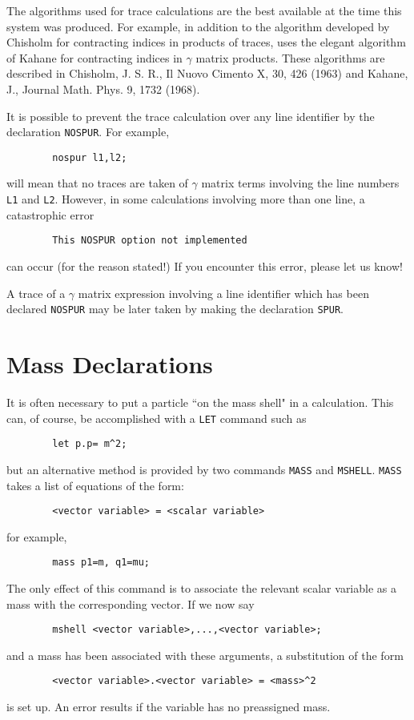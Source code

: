 The algorithms used for trace calculations are the best available at the
time this system was produced. For example, in addition to the algorithm
developed by Chisholm for contracting indices in products of traces,
{\REDUCE} uses the elegant algorithm of Kahane for contracting indices in
$\gamma$ matrix products.  These algorithms are described in Chisholm, J. S.
R., Il Nuovo Cimento X, 30, 426 (1963) and Kahane, J., Journal Math.
Phys. 9, 1732 (1968).

It is possible to prevent the trace calculation over any line identifier
by the declaration {\tt NOSPUR}.   For example,
\begin{verbatim}
        nospur l1,l2;
\end{verbatim}
will mean that no traces are taken of $\gamma$ matrix terms involving the line
numbers {\tt L1} and {\tt L2}.  However, in some calculations involving
more than one line, a catastrophic error
\begin{verbatim}
        This NOSPUR option not implemented
\end{verbatim}
can occur (for the reason stated!) If you encounter this error, please let
us know!

A trace of a $\gamma$ matrix expression involving a line identifier which has
been declared {\tt NOSPUR} may be later taken by making the declaration
{\tt SPUR}. 

\section{Mass Declarations} 

It is often necessary to put a particle ``on the mass shell" in a
calculation.  This can, of course, be accomplished with a {\tt LET}
command such as
\begin{verbatim}
        let p.p= m^2;
\end{verbatim}
but an alternative method is provided by two commands {\tt MASS} and
{\tt MSHELL}. 
{\tt MASS} takes a list of equations of the form:
\begin{verbatim}
        <vector variable> = <scalar variable>
\end{verbatim}
for example,
\begin{verbatim}
        mass p1=m, q1=mu;
\end{verbatim}
The only effect of this command is to associate the relevant scalar
variable as a mass with the corresponding vector. If we now say
\begin{verbatim}
        mshell <vector variable>,...,<vector variable>;
\end{verbatim}
and a mass has been associated with these arguments, a substitution of the
form
\begin{verbatim}
        <vector variable>.<vector variable> = <mass>^2
\end{verbatim}
is set up. An error results if the variable has no preassigned mass.

